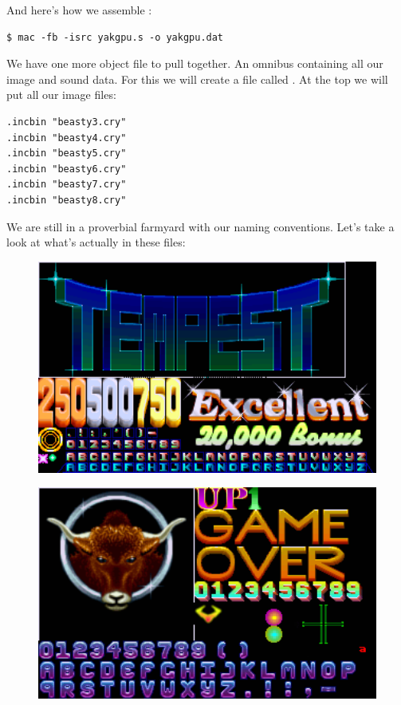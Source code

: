 And here's how we assemble :
\begin{lstlisting}
$ mac -fb -isrc yakgpu.s -o yakgpu.dat
\end{lstlisting}

We have one more object file to pull together. An omnibus containing all our image and sound data. For this
we will create a file called . At the top we will put all our image files:

\begin{lstlisting}
.incbin "beasty3.cry"
.incbin "beasty4.cry"
.incbin "beasty5.cry"
.incbin "beasty6.cry"
.incbin "beasty7.cry"
.incbin "beasty8.cry"
\end{lstlisting}

We are still in a proverbial farmyard with our naming conventions. Let's take a look at what's actually in these files:

\begin{minipage}[b]{0.48\linewidth}
\begin{figure}[H]
    \centering
    \begin{adjustbox}{width=6cm,center}
      \includegraphics[width=12cm]{cry/beasty3.png}%
    \end{adjustbox}
  \caption*{}
\end{figure}
\end{minipage}
\begin{minipage}[b]{0.48\linewidth}
\begin{figure}[H]
    \centering
    \begin{adjustbox}{width=6cm,center}
      \includegraphics[width=12cm]{cry/beasty4.png}%
    \end{adjustbox}
  \caption*{}
\end{figure}
\end{minipage}

